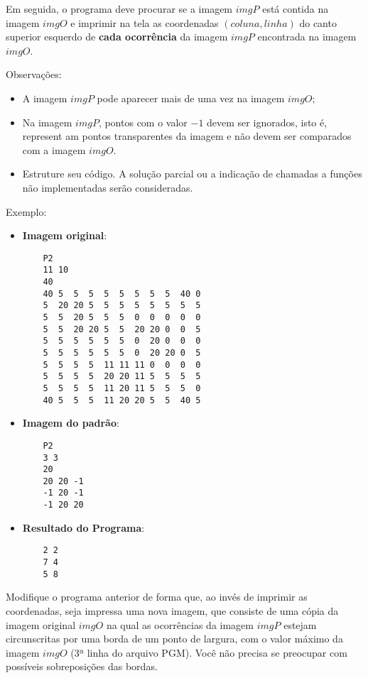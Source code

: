 Em seguida, o programa deve procurar se a imagem $imgP$ está contida na 
imagem $imgO$ e imprimir na tela as coordenadas $(coluna,linha)$ do canto 
superior esquerdo de \textbf{cada ocorrência} da imagem $imgP$ encontrada na 
imagem $imgO$.

Observações:
\begin{itemize}
    \item A imagem $imgP$ pode aparecer mais de uma vez na imagem $imgO$;
    \item Na imagem $imgP$, pontos com o valor $-1$ devem ser ignorados, isto é, represent
am pontos transparentes da imagem e não devem ser comparados com a imagem $imgO$.
    \item Estruture seu código. A solução parcial ou a indicação de chamadas a funções não
 implementadas serão consideradas.
\end{itemize}

Exemplo:
\begin{itemize}
\vspace*{-2mm}      
    \item \textbf{Imagem original}:
    \begin{verbatim}
    P2
    11 10
    40
    40 5  5  5  5  5  5  5  5  40 0 
    5  20 20 5  5  5  5  5  5  5  5
    5  5  20 5  5  5  0  0  0  0  0
    5  5  20 20 5  5  20 20 0  0  5
    5  5  5  5  5  5  0  20 0  0  0
    5  5  5  5  5  5  0  20 20 0  5
    5  5  5  5  11 11 11 0  0  0  0
    5  5  5  5  20 20 11 5  5  5  5
    5  5  5  5  11 20 11 5  5  5  0
    40 5  5  5  11 20 20 5  5  40 5
    \end{verbatim}

\vspace*{-4mm}      
    \item \textbf{Imagem do padrão}:
    \begin{verbatim}
    P2
    3 3
    20
    20 20 -1
    -1 20 -1
    -1 20 20
    \end{verbatim}
    
\vspace*{-4mm}      
    \item \textbf{Resultado do Programa}:
    \begin{verbatim}
    2 2
    7 4
    5 8   
    \end{verbatim}    
\end{itemize}

\item Modifique o programa anterior de forma que, ao invés de imprimir as 
coordenadas, seja impressa uma nova imagem, que consiste de uma cópia da 
imagem original $imgO$ na qual as ocorrências da imagem $imgP$ estejam 
circunscritas por uma borda de um ponto de largura, com o valor máximo da 
imagem $imgO$ (3ª linha do arquivo PGM). Você não precisa se preocupar com 
possíveis sobreposições das bordas.

